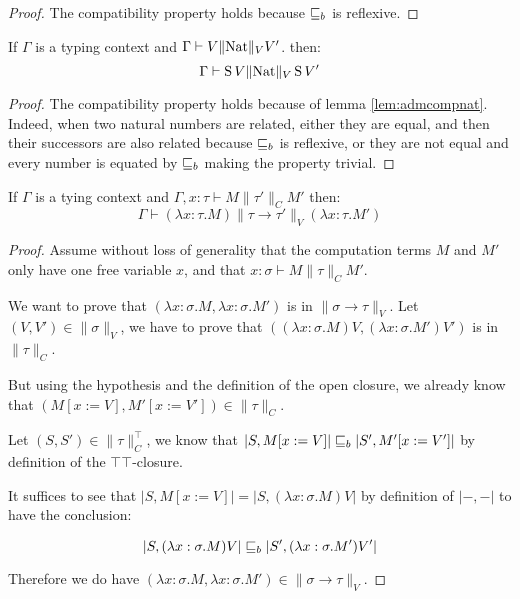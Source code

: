 \begin{proof}
The compatibility property holds 
because $\sqsubseteq_b$ is reflexive. 
\end{proof}

\begin{alemma}
    If $\Gamma$ is a typing context and $\Gamma \vdash V \| \textnormal{Nat} \|_V V'$. 
    then:
    \begin{equation*}
        \Gamma \vdash \operatorname{S} V \| \textnormal{Nat} \|_V \operatorname{S} V'
    \end{equation*}
\end{alemma}
\begin{proof}
The compatibility property
holds because of lemma \ref{lem:admcompnat}. Indeed, 
when two natural numbers are related, either they 
are equal, and then their successors are also related 
because $\sqsubseteq_b$ is reflexive, or they are not 
equal and every number is equated by $\sqsubseteq_b$ 
making the property trivial. 
\end{proof}

\begin{alemma}
    If $\Gamma$ is a tying context and 
    $\Gamma, x :\tau \vdash M \| \tau' \|_C M'$ then:
    \begin{equation*}
        \Gamma \vdash (\lambda x:\tau. M) \| \tau \to \tau' \|_V (\lambda
        x:\tau. M')
    \end{equation*}
\end{alemma}
\begin{proof}
Assume without loss of generality 
that the computation terms 
$M$ and $M'$ only have one free variable $x$,
and that $x : \sigma \vdash M \| \tau \|_C M'$.

We want to prove that $(\lambda x:\sigma .M, \lambda x:\sigma. M')$
is in $\| \sigma \to \tau\|_V$. Let $(V,V') \in \| \sigma \|_V$,
we have to prove that $((\lambda x:\sigma. M)V, (\lambda x:\sigma.
M')V')$ is in $\| \tau \|_C$.

But using the hypothesis and 
the definition of the open closure, 
we already know that 
$(M[x := V], M'[x := V']) \in \| \tau \|_C$.

Let $(S,S') \in \| \tau \|_C^\top$, we know that 
$|S, M[x := V]| \sqsubseteq_b |S', M'[x := V']|$ by definition 
of the $\top\top$-closure. 

It suffices to see that $|S, M[x := V]| = |S, (\lambda x:\sigma. M)
V|$ by definition of $|-,-|$ to have the conclusion:

\begin{equation*}
    | S, (\lambda x:\sigma. M) V| \sqsubseteq_b |S', (\lambda x:\sigma.
    M') V'| 
\end{equation*}

Therefore we do have $(\lambda x:\sigma. M, \lambda x:\sigma. M')
\in \| \sigma \to \tau \|_V$.
\end{proof}

